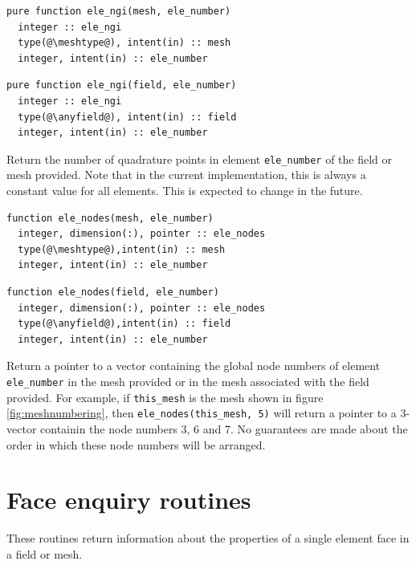\documentclass[a4paper, 11pt]{book}
\begin{document}

\begin{lstlisting}
pure function ele_ngi(mesh, ele_number)
  integer :: ele_ngi
  type(@\meshtype@), intent(in) :: mesh
  integer, intent(in) :: ele_number
\end{lstlisting}

\begin{lstlisting}
pure function ele_ngi(field, ele_number)
  integer :: ele_ngi
  type(@\anyfield@), intent(in) :: field
  integer, intent(in) :: ele_number
\end{lstlisting}

Return the number of quadrature points in element \lstinline+ele_number+ of the field
or mesh provided. Note that in the current implementation, this is always a
constant value for all elements. This is expected to change in the future.


\begin{lstlisting}
function ele_nodes(mesh, ele_number)
  integer, dimension(:), pointer :: ele_nodes
  type(@\meshtype@),intent(in) :: mesh
  integer, intent(in) :: ele_number
\end{lstlisting}

\begin{lstlisting}
function ele_nodes(field, ele_number)
  integer, dimension(:), pointer :: ele_nodes
  type(@\anyfield@),intent(in) :: field
  integer, intent(in) :: ele_number
\end{lstlisting}

Return a pointer to a vector containing the global node numbers of
element \lstinline+ele_number+ in the mesh provided or in the mesh
associated with the field provided. For example, if \lstinline+this_mesh+ is the
mesh shown in figure \ref{fig:meshnumbering}, then
\lstinline+ele_nodes(this_mesh, 5)+ will return a pointer to a 3-vector
containin the node numbers 3, 6 and 7. No guarantees are made about the
order in which these node numbers will be arranged. 

\section{Face enquiry routines}

These routines return information about the properties of a single element face
in a field or mesh.

\end{document}
